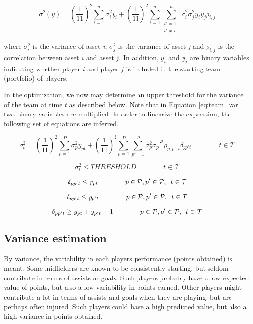 \begin{equation}
    \sigma^2(y) = (\frac{1}{11})^2\sum_{i = 1}^{n}\sigma_i^2y_i + (\frac{1}{11})^2\sum_{i = 1}^{n}\sum_{\substack{i' = 1;\\ i' \neq i}}^{n} \sigma_i^2\sigma_j^2y_iy_j\rho_{i,j}
    \label{eq:team_var}
\end{equation}

where $\sigma_{i}^2$ is the variance of asset \textit{i}, $\sigma_{j}^2$ is the variance of asset \textit{j} and $\rho_{i,j}$ is the correlation between asset $i$ and asset $j$. In addition, $y_i$ and $y_j$ are binary variables indicating whether player $i$ and player $j$ is included in the starting team (portfolio) of players.\newline

In the optimization, we now may determine an upper threshold for the variance of the team at time $t$ as described below. Note that in Equation \ref{eq:team_var} two binary variables are multiplied. In order to linearize the expression, the following set of equations are inferred.

\begin{equation}
    \sigma^2_{t} = (\frac{1}{11})^2\sum_{p = 1}^{P}\sigma_p^2 y_{pt} + (\frac{1}{11})^2\sum_{p = 1}^{P}\sum_{p' = 1}^{P} \sigma_p^2\sigma_p'^2\rho_{p,p',t} \delta_{pp't} \qquad\qquad t \in \mathcal{T}
\end{equation}

\begin{equation}
    \sigma^2_{t} \leq THRESHOLD \qquad\qquad t \in \mathcal{T}
\end{equation}

\begin{equation}
    \delta_{pp't} \leq y_{pt}  \qquad\qquad p \in \mathcal{P}, p' \in \mathcal{P}, \enskip t \in \mathcal{T}
\end{equation}

\begin{equation}
    \delta_{pp't} \leq y_{p't}  \qquad\qquad p \in \mathcal{P}, p' \in \mathcal{P}, \enskip t \in \mathcal{T}
\end{equation}

\begin{equation}
    \delta_{pp't} \geq y_{pt} + y_{p't} - 1  \qquad\qquad p \in \mathcal{P}, p' \in \mathcal{P}, \enskip t \in \mathcal{T}
\end{equation}


\subsection{Variance estimation}
By variance, the variability in each players performance (points obtained) is meant. Some midfielders are known to be consistently starting, but seldom contribute in terms of assists or goals. Such players probably have a low expected value of points, but also a low variability in points earned. Other players might contribute a lot in terms of assists and goals when they are playing, but are perhaps often injured. Such players could have a high predicted value, but also a high variance in points obtained.\newpar


